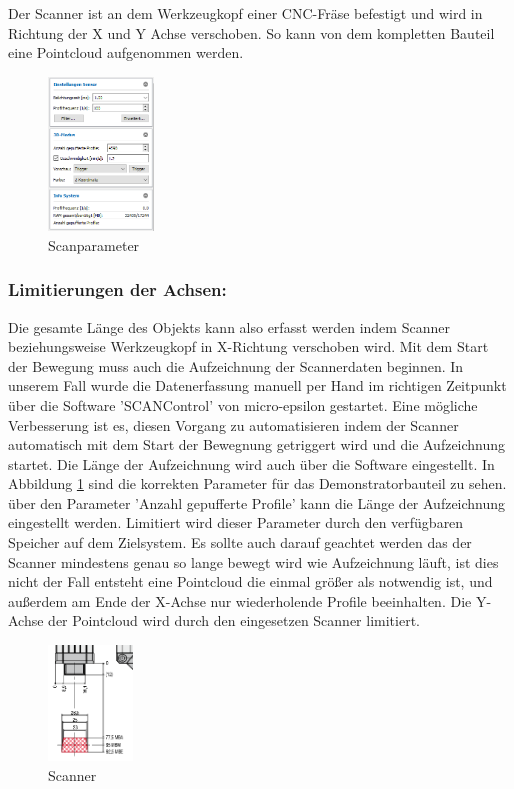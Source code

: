 \documentclass[../main.tex]{subfiles}
\begin{document}
Der Scanner ist an dem Werkzeugkopf einer CNC-Fräse befestigt und wird 
in Richtung der X und Y Achse verschoben. So kann von dem kompletten Bauteil eine 
Pointcloud aufgenommen werden.

\begin{figure}
    \includegraphics[width=0.25\textwidth]{images/Parameter_Scan.png}
    \caption{Scanparameter}
    \label{fig:scanparameter}
\end{figure}

\subsubsection{Limitierungen der Achsen:}

Die gesamte Länge des Objekts kann also erfasst werden indem Scanner 
beziehungsweise Werkzeugkopf in X-Richtung verschoben wird. Mit dem Start der 
Bewegung muss auch die Aufzeichnung der Scannerdaten beginnen. In unserem Fall wurde
die Datenerfassung manuell per Hand im richtigen Zeitpunkt über die Software 
'SCANControl' von micro-epsilon gestartet. 
Eine mögliche Verbesserung ist es, diesen Vorgang zu automatisieren indem der 
Scanner automatisch mit dem Start der Bewegnung getriggert wird und die Aufzeichnung
startet. Die Länge der Aufzeichnung wird auch über die Software eingestellt. 
In Abbildung \ref{fig:scanparameter} sind die korrekten Parameter für das 
Demonstratorbauteil zu sehen. über den Parameter 'Anzahl gepufferte Profile' kann 
die Länge der Aufzeichnung eingestellt werden. Limitiert wird dieser Parameter 
durch den verfügbaren Speicher auf dem Zielsystem. Es sollte auch darauf geachtet 
werden das der Scanner mindestens genau so lange bewegt wird wie Aufzeichnung läuft, 
ist dies nicht der Fall entsteht eine Pointcloud die einmal größer als notwendig ist, 
und außerdem am Ende der X-Achse nur wiederholende Profile beeinhalten. 
Die Y-Achse der Pointcloud wird durch den eingesetzen Scanner limitiert. 

\begin{figure}
    \includegraphics[width=0.2\textwidth]{images/Scanner.PNG}
    \caption{Scanner}
    \label{fig:scanner}
\end{figure}
\end{document}
